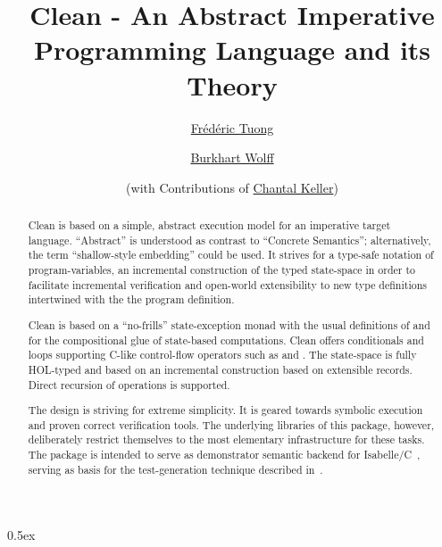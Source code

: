 \documentclass[fontsize=11pt,paper=a4,open=right,twoside,abstract=true]{scrreprt}
\newcommand{\HOL}{HOL}
\begin{document}
\title{Clean - An Abstract Imperative Programming Language and its Theory}
\author{%
  \href{https://www.lri.fr/~ftuong/}{Fr\'ed\'eric Tuong}
  \and
  \href{https://www.lri.fr/~wolff/}{Burkhart Wolff} \\
  \and
  (with Contributions of \href{https://www.lri.fr/~keller/}{Chantal Keller})}
\publishers{%
  \mbox{LRI, Univ. Paris-Sud, CNRS, Universit\'e Paris-Saclay} \\
  b\^at. 650 Ada Lovelace, 91405 Orsay, France \texorpdfstring{\\}{}
}

\maketitle

\begin{abstract}
Clean  is based on a simple, abstract execution model for an
imperative target language. ``Abstract'' is understood as contrast to ``Concrete Semantics'';
alternatively, the term ``shallow-style embedding'' could be used. It strives for a type-safe
notation of program-variables, an incremental construction of the typed state-space in order 
to facilitate incremental verification and open-world extensibility to new type definitions 
intertwined with the the program definition.

Clean is based on a ``no-frills'' state-exception monad with the usual definitions of  and
 for the compositional glue of state-based computations. Clean offers conditionals and
loops supporting C-like control-flow operators such as  and . The state-space
is fully \HOL{}-typed and based on an incremental construction based on extensible
records. Direct recursion of operations is supported.

The design is striving for extreme simplicity. It is geared towards symbolic execution and proven
correct verification tools. The underlying libraries of this package, however, deliberately
restrict themselves to the most elementary infrastructure for these tasks. The package is intended to
serve as demonstrator semantic backend for Isabelle/C~\cite{TuongWolff19}, serving as basis for the
test-generation technique described in~\cite{DBLP:conf/tap/Keller18}.
\end{abstract}

\newpage
\tableofcontents

\parindent 0pt\parskip 0.5ex

% 
\newpage

\end{document}
